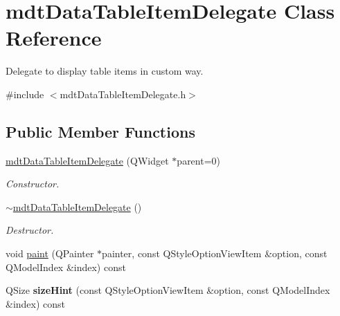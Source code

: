 \hypertarget{classmdt_data_table_item_delegate}{
\section{mdtDataTableItemDelegate Class Reference}
\label{classmdt_data_table_item_delegate}
}


Delegate to display table items in custom way.  




{\ttfamily \#include $<$mdtDataTableItemDelegate.h$>$}

\subsection*{Public Member Functions}
\begin{DoxyCompactItemize}
\item 
\hypertarget{classmdt_data_table_item_delegate_a3b09cdefe25ed24d764202949e12d315}{
\hyperlink{classmdt_data_table_item_delegate_a3b09cdefe25ed24d764202949e12d315}{mdtDataTableItemDelegate} (QWidget $\ast$parent=0)}
\label{classmdt_data_table_item_delegate_a3b09cdefe25ed24d764202949e12d315}

\begin{DoxyCompactList}\small\item\em Constructor. \end{DoxyCompactList}\item 
\hypertarget{classmdt_data_table_item_delegate_ae48959402e09daae5e6e102c025c43bd}{
\hyperlink{classmdt_data_table_item_delegate_ae48959402e09daae5e6e102c025c43bd}{$\sim$mdtDataTableItemDelegate} ()}
\label{classmdt_data_table_item_delegate_ae48959402e09daae5e6e102c025c43bd}

\begin{DoxyCompactList}\small\item\em Destructor. \end{DoxyCompactList}\item 
void \hyperlink{classmdt_data_table_item_delegate_ae10a1b1d19910be11276e8a132fa145b}{paint} (QPainter $\ast$painter, const QStyleOptionViewItem \&option, const QModelIndex \&index) const 
\item 
\hypertarget{classmdt_data_table_item_delegate_a38e292efffe36a5a983ff7876c1fc19c}{
QSize {\bfseries sizeHint} (const QStyleOptionViewItem \&option, const QModelIndex \&index) const }
\label{classmdt_data_table_item_delegate_a38e292efffe36a5a983ff7876c1fc19c}

\end{DoxyCompactItemize}


